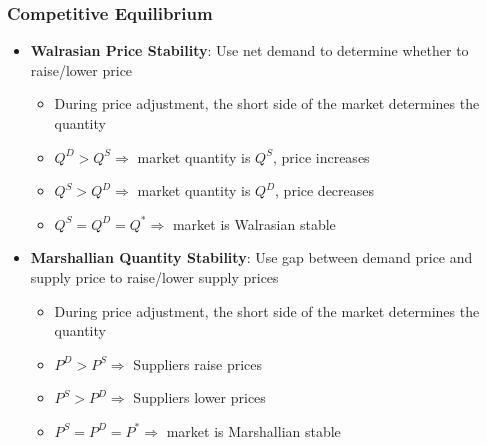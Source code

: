 \documentclass{article}
\newcommand{\blue}[1]{{\color{blue}#1}}
\begin{document}
\subsubsection{Competitive Equilibrium}
\begin{itemize}
	\item \textbf{Walrasian Price Stability}: Use net demand to determine whether to raise/lower price
		\begin{itemize}
			\item During price adjustment, the \blue{short side} of the market determines the quantity
			\item $Q^D>Q^S\Rightarrow$ market quantity is $Q^S$, price increases
			\item $Q^S>Q^D\Rightarrow$ market quantity is $Q^D$, price decreases
			\item $Q^S=Q^D=Q^*\Rightarrow$ market is Walrasian stable
		\end{itemize}
	\item \textbf{Marshallian Quantity Stability}: Use gap between demand price and supply price to raise/lower supply prices
		\begin{itemize}
			\item During price adjustment, the \blue{short side} of the market determines the quantity
			\item $P^D>P^S\Rightarrow$ Suppliers raise prices
			\item $P^S>P^D\Rightarrow$ Suppliers lower prices
			\item $P^S=P^D=P^*\Rightarrow$ market is Marshallian stable
		\end{itemize}
\end{itemize}
\end{document}
